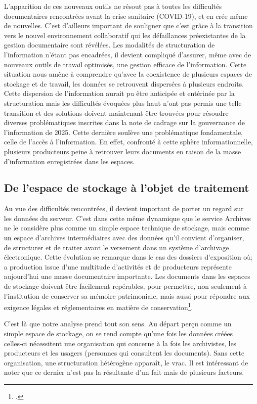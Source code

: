 L’apparition de ces nouveaux outils ne résout pas à toutes les difficultés documentaires rencontrées avant la crise sanitaire (COVID-19), et en crée même de nouvelles.  C'est d'ailleurs important de souligner que c’est grâce à la transition vers le nouvel environnement collaboratif qui les défaillances préexistantes de la gestion documentaire sont révélées. Les modalités de structuration de l’information n’étant pas encadrées, il devient compliqué d’assurer, même avec de nouveaux outils de travail optimisés, une  gestion efficace de l’information. Cette situation nous amène à comprendre qu’avec la coexistence de plusieurs espaces de stockage et de travail, les données se retrouvent dispersées à plusieurs endroits. Cette dispersion de l’information aurait pu être anticipée et entérinée par la structuration mais les difficultés évoquées plus haut n’ont pas permis une telle transition et des solutions doivent maintenant être trouvées pour résoudre diverses problématiques inscrites dans la note de cadrage sur la gouvernance de l'information de 2025. Cette dernière soulève une problématique fondamentale, celle de l’accès à l’information. En effet, confronté à cette sphère informationnelle, plusieurs producteurs peine à retrouver leurs documents en raison de la masse d’information enregistrées dans les espaces. 


\subsection*{De l’espace de stockage à l’objet de traitement}

Au vue des difficultés rencontrées, il devient important de porter un regard sur les données du serveur. C’est dans cette même dynamique que le service Archives ne le considère plus comme un simple espace technique de stockage, mais comme un espace d’archives intermédiaires avec des données qu’il convient d’organiser, de structurer et de traiter avant le versement dans un système d’archivage électronique. Cette évolution se remarque dans le cas des dossiers d’exposition où; a production issue d’une multitude d’activités et de producteurs représente aujourd’hui une masse documentaire importante. Les documents dans les espaces de stockage doivent être facilement repérables, pour permettre, non seulement à l’institution de conserver sa mémoire patrimoniale, mais aussi pour  répondre aux exigence légales et réglementaires en matière de conservation\footcite[version 4, p.~7]{bomel-dion-note-cadrage}.

C’est là que notre analyse prend tout son sens. Au départ perçu comme un simple espace de stockage, on se rend compte qu’une fois les données créées celles-ci nécessitent une organisation qui concerne à la fois les archivistes, les producteurs et les usagers (personnes qui consultent les documents). Sans cette organisation, une structuration hétérogène apparaît, le vrac. Il est intéressant de noter que ce dernier n'est pas la résultante d’un fait mais de plusieurs facteurs.


